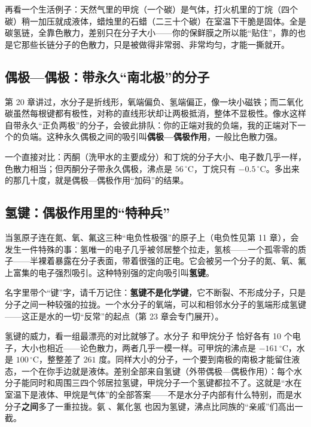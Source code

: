 再看一个生活例子：天然气里的甲烷（一个碳）是气体，打火机里的丁烷（四个碳）稍一加压就成液体，蜡烛里的石蜡（二三十个碳）在室温下干脆是固体。全是碳氢链，全靠色散力，差别只在分子大小——你的保鲜膜之所以能“贴住”，靠的也是它那些长链分子的色散力，只是被做得非常弱、非常均匀，才能一撕就开。

\subsection{偶极—偶极：带永久“南北极”的分子}

第 20 章讲过，水分子是折线形，氧端偏负、氢端偏正，像一块小磁铁；而二氧化碳虽然每根键都有极性，对称的直线形状却让两极抵消，整体不显极性。像水这样自带永久“正负两极”的分子，会彼此排队：你的正端对我的负端，我的正端对下一个的负端。这种永久偶极之间的吸引叫\textbf{偶极—偶极作用}，一般比色散力强。

一个直接对比：丙酮（洗甲水的主要成分）和丁烷的分子大小、电子数几乎一样，色散力相当；但丙酮分子带永久偶极，沸点是 $56\,^{\circ}\mathrm{C}$，丁烷只有 $-0.5\,^{\circ}\mathrm{C}$。多出来的那几十度，就是偶极—偶极作用“加码”的结果。

\subsection{氢键：偶极作用里的“特种兵”}

当氢原子连在氮、氧、氟这三种“电负性极强”的原子上（电负性见第 11 章），会发生一件特殊的事：氢唯一的电子几乎被邻居整个拉走，氢核——一个孤零零的质子——半裸着暴露在分子表面，带着很强的正电。它会被另一个分子的氮、氧、氟上富集的电子强烈吸引。这种特别强的定向吸引叫\textbf{氢键}。

名字里带个“键”字，请千万记住：\textbf{氢键不是化学键}，它不断裂、不形成分子，只是分子之间一种较强的拉拢。一个水分子的氧端，可以和相邻水分子的氢端形成氢键——这正是水的一切“反常”的起点（第 23 章会专门展开）。

氢键的威力，看一组最漂亮的对比就够了。水分子  和甲烷分子  恰好各有 10 个电子，大小也相近——论色散力，两者几乎一模一样。可甲烷的沸点是 $-161\,^{\circ}\mathrm{C}$，水是 $100\,^{\circ}\mathrm{C}$，整整差了 $261$ 度。同样大小的分子，一个要到南极的南极才能留住液态，一个在你手边就是液体。差别全部来自氢键（外带偶极—偶极作用）：每个水分子能同时和周围三四个邻居拉氢键，甲烷分子一个氢键都拉不了。这就是“水在室温下是液体、甲烷是气体”的全部答案——不是水分子内部有什么特别，而是水分子\textbf{之间}多了一重拉拢。氨 、氟化氢  也因为氢键，沸点比同族的“亲戚”们高出一截。

